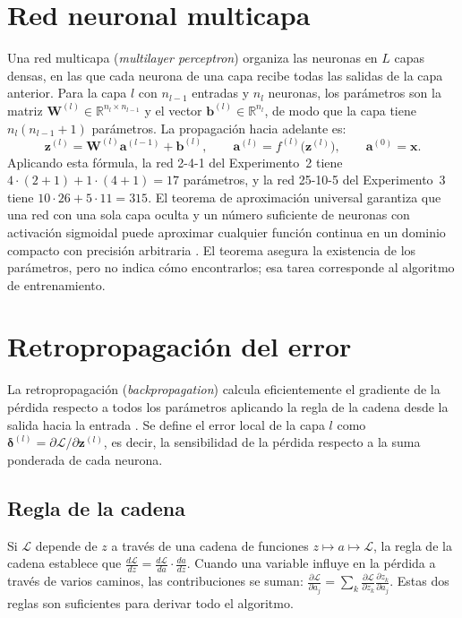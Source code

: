 \section{Red neuronal multicapa}
Una red multicapa (\emph{multilayer perceptron}) organiza las neuronas en $L$ capas densas, en las que cada neurona de una capa recibe todas las salidas de la capa anterior. Para la capa $l$ con $n_{l-1}$ entradas y $n_l$ neuronas, los parámetros son la matriz $\mathbf{W}^{(l)}\in\mathbb{R}^{n_l\times n_{l-1}}$ y el vector $\mathbf{b}^{(l)}\in\mathbb{R}^{n_l}$, de modo que la capa tiene $n_l(n_{l-1}+1)$ parámetros. La propagación hacia adelante es:
\begin{equation}
\mathbf{z}^{(l)} = \mathbf{W}^{(l)}\mathbf{a}^{(l-1)} + \mathbf{b}^{(l)}, \qquad \mathbf{a}^{(l)} = f^{(l)}\bigl(\mathbf{z}^{(l)}\bigr), \qquad \mathbf{a}^{(0)} = \mathbf{x}.\label{eq:forward}
\end{equation}
Aplicando esta fórmula, la red 2-4-1 del Experimento~2 tiene $4\cdot(2+1) + 1\cdot(4+1) = 17$ parámetros, y la red 25-10-5 del Experimento~3 tiene $10\cdot 26 + 5\cdot 11 = 315$. El teorema de aproximación universal garantiza que una red con una sola capa oculta y un número suficiente de neuronas con activación sigmoidal puede aproximar cualquier función continua en un dominio compacto con precisión arbitraria \citep{cybenko1989,hornik1989}. El teorema asegura la existencia de los parámetros, pero no indica cómo encontrarlos; esa tarea corresponde al algoritmo de entrenamiento.

\section{Retropropagación del error}
La retropropagación (\emph{backpropagation}) calcula eficientemente el gradiente de la pérdida respecto a todos los parámetros aplicando la regla de la cadena desde la salida hacia la entrada \citep{rumelhart1986}. Se define el error local de la capa $l$ como $\boldsymbol{\delta}^{(l)} = \partial\mathcal{L}/\partial\mathbf{z}^{(l)}$, es decir, la sensibilidad de la pérdida respecto a la suma ponderada de cada neurona.

\subsection{Regla de la cadena}
Si $\mathcal{L}$ depende de $z$ a través de una cadena de funciones $z\mapsto a\mapsto \mathcal{L}$, la regla de la cadena establece que $\frac{d\mathcal{L}}{dz} = \frac{d\mathcal{L}}{da}\cdot\frac{da}{dz}$. Cuando una variable influye en la pérdida a través de varios caminos, las contribuciones se suman: $\frac{\partial\mathcal{L}}{\partial a_j} = \sum_k \frac{\partial\mathcal{L}}{\partial z_k}\frac{\partial z_k}{\partial a_j}$. Estas dos reglas son suficientes para derivar todo el algoritmo.

